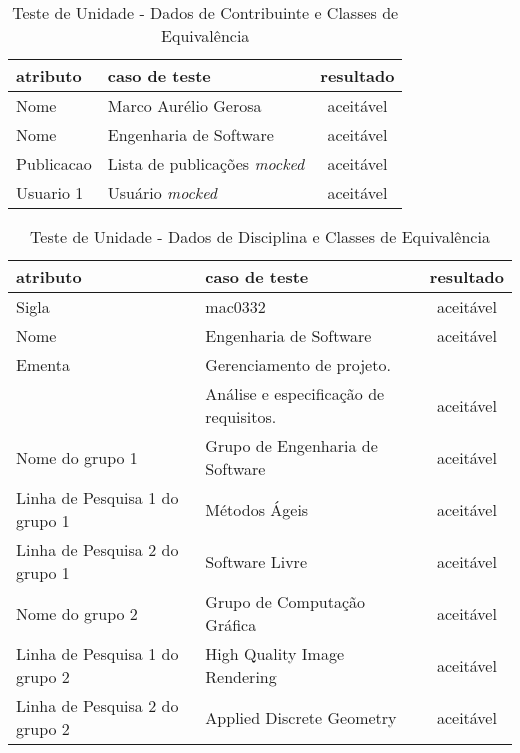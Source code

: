 \documentclass[11pt, a4paper]{book}
\begin{document}
\begin{table}
\renewcommand{\arraystretch}{1.3}
 \caption{Teste de Unidade - Dados de Contribuinte e Classes de Equivalência}
  \label{tab:table1}
\centering
\begin{tabular}[htb]{l|l|c}
\hline\hline
atributo & caso de teste & resultado\\
\hline
Nome & Marco Aurélio Gerosa & aceitável \\
Nome& Engenharia de Software & aceitável \\
Publicacao & Lista de publicações \emph{mocked} & aceitável \\

Usuario 1 & Usuário \emph{mocked} & aceitável \\

\hline 
\end{tabular}
\end{table}


\begin{table}
\renewcommand{\arraystretch}{1.3}
 \caption{Teste de Unidade - Dados de Disciplina e Classes de Equivalência}
  \label{tab:table2}
\centering
\begin{tabular}[htb]{l|l|c}
\hline\hline
atributo & caso de teste & resultado\\
\hline
Sigla & mac0332 & aceitável \\
Nome& Engenharia de Software & aceitável \\
Ementa & Gerenciamento de projeto. & \\
             & Análise e especificação de requisitos. & aceitável \\

Nome do grupo 1 & Grupo de Engenharia de Software & aceitável \\
Linha de Pesquisa 1 do grupo 1& Métodos Ágeis & aceitável \\
Linha de Pesquisa 2 do grupo 1& Software Livre & aceitável \\

Nome do grupo 2 & Grupo de Computação Gráfica & aceitável \\
Linha de Pesquisa 1 do grupo 2& High Quality Image Rendering & aceitável \\
Linha de Pesquisa 2 do grupo 2& Applied Discrete Geometry & aceitável \\

\hline 
\end{tabular}
\end{table}
\end{document}
